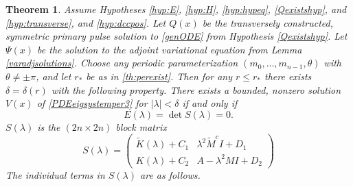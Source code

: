 \documentclass[10pt,reqno]{amsart}
\theoremstyle{plain}
\newtheorem{theorem}{Theorem}
\theoremstyle{definition}
\theoremstyle{remark}
\numberwithin{theorem}{section}
\numberwithin{equation}{section}
\begin{document}
\begin{theorem}\label{blockmatrixtheorem}
Assume Hypotheses \ref{hyp:E}, \ref{hyp:H}, \ref{hyp:hypeq}, \ref{Qexistshyp}, and \ref{hyp:transverse}, and \ref{hyp:dccpos}. Let $Q(x)$ be the transversely constructed, symmetric primary pulse solution to \eqref{genODE} from Hypothesis \ref{Qexistshyp}. Let $\Psi(x)$ be the solution to the adjoint variational equation from Lemma \ref{varadjsolutions}. Choose any periodic parameterization $(m_0, \dots, m_{n-1}, \theta)$ with $\theta \neq \pm \pi$, and let $r_*$ be as in \cref{th:perexist}. Then for any $r \leq r_*$ there exists $\delta = \delta(r)$ with the following property. There exists a bounded, nonzero solution $V(x)$ of \cref{PDEeigsystemper3} for $|\lambda| < \delta$ if and only if
\begin{equation}\label{blockmatrixcond}
E(\lambda) = \det S(\lambda) = 0.
\end{equation}
$S(\lambda)$ is the $(2n \times 2n)$ block matrix
\begin{equation}\label{blockeq}
S(\lambda) = 
\begin{pmatrix}
\tilde{K}(\lambda) + C_1 & \lambda^2 \tilde{M}^c I + D_1 \\
K(\lambda) + C_2 & A - \lambda^2 MI + D_2
\end{pmatrix}
\end{equation}
The individual terms in $S(\lambda)$ are as follows.


\end{theorem}
\end{document}
